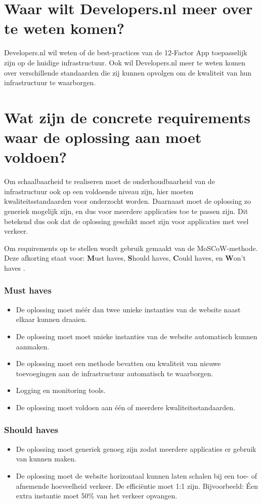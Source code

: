 \section{Waar wilt Developers.nl meer over te weten komen?}

Developers.nl wil weten of de best-practices van de 12-Factor App toepasselijk zijn op de huidige infrastructuur. Ook wil Developers.nl meer te weten komen over verschillende standaarden die zij kunnen opvolgen om de kwaliteit van hun infrastructuur te waarborgen.

\section{Wat zijn de concrete requirements waar de oplossing aan moet voldoen?}

Om schaalbaarheid te realiseren moet de onderhoudbaarheid van de infrastructuur ook op een voldoende niveau zijn, hier moeten kwaliteitsstandaarden voor onderzocht worden. Daarnaast moet de oplossing zo generiek mogelijk zijn, en dus voor meerdere applicaties toe te passen zijn. Dit betekend dus ook dat de oplossing geschikt moet zijn voor applicaties met veel verkeer.

Om requirements op te stellen wordt gebruik gemaakt van de MoSCoW-methode. Deze afkorting staat voor: \textbf{M}ust haves, \textbf{S}hould haves, \textbf{C}ould haves, en \textbf{W}on't haves \parencite{Moscow}.

\subsubsection{Must haves}
\begin{itemize}
	\item De oplossing moet méér dan twee unieke instanties van de website naast elkaar kunnen draaien.
	\item De oplossing moet moet unieke instanties van de website automatisch kunnen aanmaken.
	\item De oplossing moet een methode bevatten om kwaliteit van nieuwe toevoegingen aan de infrastructuur automatisch te waarborgen.
	\item Logging en monitoring tools.
	\item De oplossing moet voldoen aan één of meerdere kwaliteitsstandaarden.
\end{itemize}

\subsubsection{Should haves}
\begin{itemize}
	\item De oplossing moet generiek genoeg zijn zodat meerdere applicaties er gebruik van kunnen maken.
	\item De oplossing moet de website horizontaal kunnen laten schalen bij een toe- of afnemende hoeveelheid verkeer. De efficiëntie moet 1:1 zijn. Bijvoorbeeld: Éen extra instantie moet 50\% van het verkeer opvangen.
\end{itemize}

